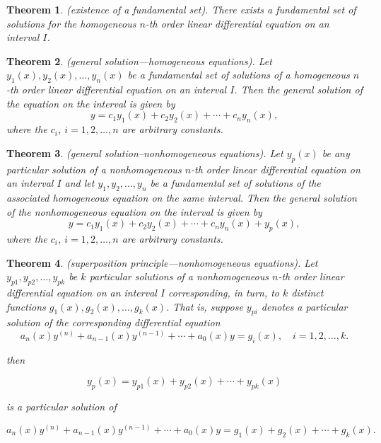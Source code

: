 \documentclass{article}
\theoremstyle{plain}
\newtheorem{thm}{Theorem}[section]
\theoremstyle{definition}
\theoremstyle{remark}
\begin{document}
\begin{thm} (existence of a fundamental set).
    There exists a fundamental set of solutions for the homogeneous \(n\)-th order linear differential equation on an interval \(I\).
    
\end{thm}

\begin{thm} (general solution—homogeneous equations).
    Let \(y_1(x), y_2(x), \ldots, y_n(x)\) be a fundamental set of solutions of a homogeneous \(n\)-th order linear differential equation on an interval \(I\). Then the \emph{general solution} of the equation on the interval is given by
    \begin{equation}
        y = c_1y_1(x) + c_2y_2(x) + \cdots + c_ny_n(x),
    \end{equation}
    where the \(c_i\), \(i = 1, 2, \ldots, n\) are arbitrary constants.
\end{thm}

\begin{thm} (general solution--nonhomogeneous equations).
    Let \(y_p(x)\) be any particular solution of a nonhomogeneous \(n\)-th order linear differential equation on an interval \(I\) and let \(y_1, y_2, \ldots, y_n\) be a fundamental set of solutions of the associated homogeneous equation on the same interval. Then the \emph{general solution} of the nonhomogeneous equation on the interval is given by
    \begin{equation}
        y = c_1y_1(x) + c_2y_2(x) + \cdots + c_ny_n(x) + y_p(x),
    \end{equation}
    where the \(c_i\), \(i = 1, 2, \ldots, n\) are arbitrary constants.
\end{thm}

\begin{thm} (superposition principle—nonhomogeneous equations).
    Let \(y_{p1}, y_{p2}, \ldots, y_{pk}\) be \(k\) particular solutions of a nonhomogeneous \(n\)-th order linear differential equation on an interval \(I\) corresponding, in turn, to \(k\) distinct functions \(g_1(x), g_2(x), \ldots, g_k(x)\). That is, suppose \(y_{pi}\) denotes a particular solution of the corresponding differential equation
    \begin{equation}
        a_n(x)y^{(n)} + a_{n-1}(x)y^{(n-1)} + \cdots + a_0(x)y = g_i(x), \quad i = 1, 2, \ldots, k.
    \end{equation}
    
    \noindent then
    
    \begin{equation}
        y_p(x) = y_{p1}(x) + y_{p2}(x) + \cdots + y_{pk}(x)
    \end{equation}
    
    \noindent is a particular solution of
    
    \begin{equation}
        a_n(x)y^{(n)} + a_{n-1}(x)y^{(n-1)} + \cdots + a_0(x)y = g_1(x) + g_2(x) + \cdots + g_k(x).
    \end{equation}
\end{thm}
\end{document}
